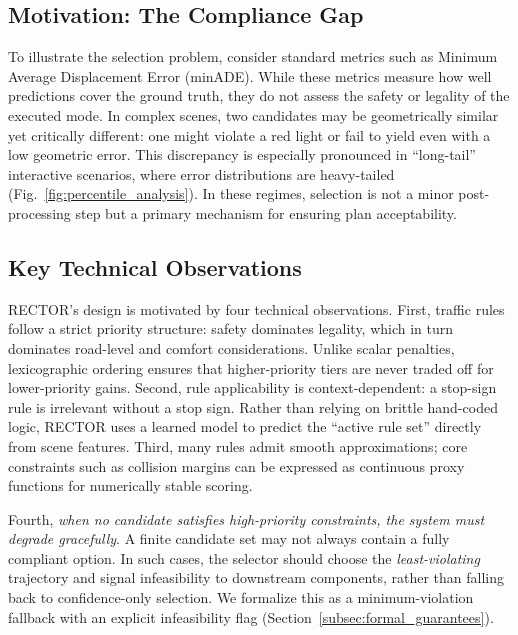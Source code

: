 \subsection{Motivation: The Compliance Gap}
\label{subsec:motivation}

To illustrate the selection problem, consider standard metrics such as Minimum Average Displacement Error (minADE).  While these metrics measure how well predictions cover the ground truth, they do not assess the safety or legality of the executed mode.  In complex scenes, two candidates may be geometrically similar yet critically different: one might violate a red light or fail to yield even with a low geometric error.  This discrepancy is especially pronounced in ``long-tail'' interactive scenarios, where error distributions are heavy-tailed (Fig.~\ref{fig:percentile_analysis}).  In these regimes, selection is not a minor post-processing step but a primary mechanism for ensuring plan acceptability.

\subsection{Key Technical Observations}
\label{subsec:observations}

RECTOR’s design is motivated by four technical observations. First, traffic rules follow a strict priority structure: safety dominates legality, which in turn dominates road-level and comfort considerations.  Unlike scalar penalties, lexicographic ordering ensures that higher-priority tiers are never traded off for lower-priority gains. Second, rule applicability is context-dependent: a stop-sign rule is irrelevant without a stop sign.  Rather than relying on brittle hand-coded logic, \textsc{RECTOR} uses a learned model to predict the ``active rule set'' directly from scene features. Third, many rules admit smooth approximations; core constraints such as collision margins can be expressed as continuous proxy functions for numerically stable scoring.

Fourth, \emph{when no candidate satisfies high-priority constraints, the system must degrade gracefully}. A finite candidate set may not always contain a fully compliant option.  In such cases, the selector should choose the \emph{least-violating} trajectory and signal infeasibility to downstream components, rather than falling back to confidence-only selection.  We formalize this as a minimum-violation fallback with an explicit infeasibility flag (Section~\ref{subsec:formal_guarantees}).

